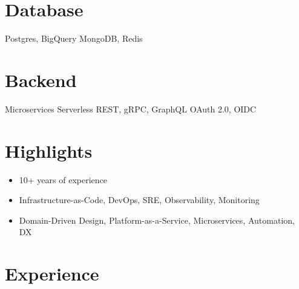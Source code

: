 \documentclass[]{cv-style}                     %
\begin{document}
\begin{aside}
\section{Database}
Postgres, BigQuery
MongoDB, Redis
%
\section{Backend}
Microservices
Serverless
REST, gRPC, GraphQL
OAuth 2.0, OIDC
%
%
\end{aside}



\section{Highlights}


\begin{itemize}
  \setlength{\itemsep}{-4pt}
  \item 10+ years of experience
  \item Infrastructure-as-Code, DevOps, SRE, Observability, Monitoring
  \item Domain-Driven Design, Platform-as-a-Service, Microservices, Automation, DX
\end{itemize}



\section{Experience}
\end{document}
